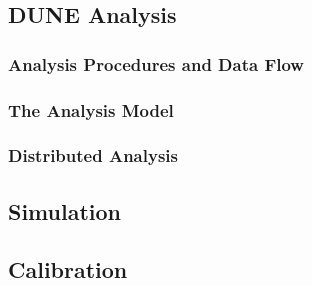 \subsection{DUNE Analysis}
\subsubsection{Analysis Procedures and Data Flow}
\subsubsection{The Analysis Model}
\subsubsection{Distributed Analysis}

\subsection{Simulation}
\subsection{Calibration}
